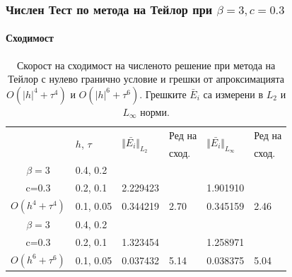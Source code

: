\documentclass{beamer}
\begin{document}
\begin{frame}

\frametitle{Числен Тест по метода на Тейлор при $\beta = 3, c=0.3$}
\framesubtitle{Сходимост}

\begin{table}
\centering
\small
		\begin{tabular}{||c|l|ll|ll||}
			\hline
			\hline
      \multirow{2  }{*}{ }        & \multirow{2  }{*}{$h$, $\tau$}  &  	\multirow{2  }{*}{ $\Vert \bar{ E_i} \Vert_{L_2}$ }	&Ред на	& \multirow{2  }{*}{ $\Vert \bar{ E_i} \Vert_{L_\infty}$ } 		&Ред на   \\
	                                        &                                                & 							 					&  сход. 	& 								       					& сход. \\
\hline 
\hline 
       $\beta=3$        	&0.4, 0.2      &             	&            &           &   \\
           c=0.3    		&0.2, 0.1      &  2.229423 &            & 1.901910 &   \\
  $O(h^4+ \tau^4)$  	&0.1, 0.05   	&  0.344219 	&2.70  	 & 0.345159  &  2.46 \\

\hline
  $\beta=3$     		&0.4, 0.2   	&            	&          	&                  &      \\
      c=0.3                  &0.2, 0.1   	&1.323454   &            &1.258971 &   \\
 $O(h^6+ \tau^6)$ 	&0.1, 0.05 	&  0.037432 	&5.14  	 &0.038375  & 5.04 \\
\hline
\hline 
		\end{tabular}
		\caption{Скорост на сходимост на численото решение при метода на Тейлор с нулево гранично условие и грешки от апроксимацията $O(|h|^{4} + \tau^4 )$ и $O(|h|^{6} + \tau^6 )$. Грешките $\bar E_i$ са измерени в $L_2$ и $L_\infty$ норми.}

\end{table}

\end{frame}
\end{document}
